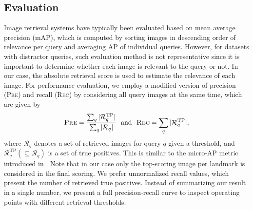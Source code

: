 \documentclass[10pt,twocolumn,letterpaper]{article}
\begin{document}
\subsection{Evaluation} 
\label{sub:metrics}
Image retrieval systems have typically been evaluated based on mean average precision (mAP), which is computed by sorting images in descending order of relevance per query and averaging AP of individual queries.
However, for datasets with distractor queries, such evaluation method is not representative since it is important to determine whether each image is relevant to the query or not.
In our case, the absolute retrieval score is used to estimate the relevance of each image.
For performance evaluation, we employ a modified version of precision (\textsc{Pre}) and recall (\textsc{Rec}) by considering all query images at the same time, which are given by 
\begin{align}
\textsc{Pre} = \frac{\sum_{q} | \mathcal{R}^\text{TP}_q |}{\sum_{q} |\mathcal{R}_q |}~~\text{and}~~
\textsc{Rec} = \sum_{q} | \mathcal{R}^\text{TP}_q |,
\label{eq:pr_def}
\end{align}
where $\mathcal{R}_q$ denotes a set of retrieved images for query $q$ given a threshold, and $\mathcal{R}_q^\text{TP} (\subseteq \mathcal{R}_q)$ is a set of true positives.
This is similar to the micro-AP metric introduced in \cite{perronnin2009}.
Note that in our case only the top-scoring image per landmark is considered in the final scoring.
We prefer unnormalized recall values, which present the number of retrieved true positives.
Instead of summarizing our result in a single number, we present a full precision-recall curve to inspect operating points with different retrieval thresholds.
\end{document}
